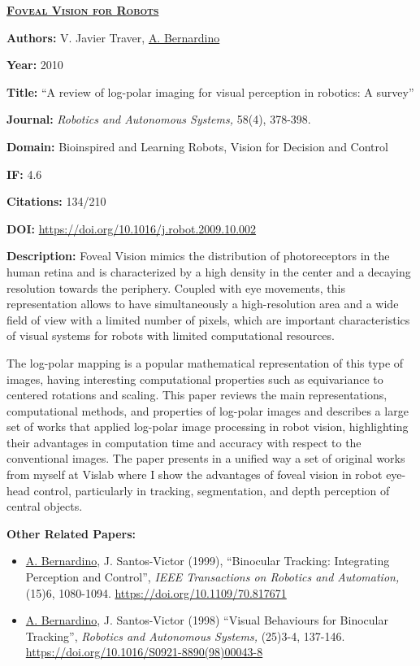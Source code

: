 \documentclass[
]{article}
\begin{document}
\textbf{\textsc{\ul{Foveal Vision for Robots}}}

\textbf{Authors:} V. Javier Traver, \ul{A. Bernardino}

\textbf{Year:} 2010

\textbf{Title:} ``A review of log-polar imaging for visual perception in
robotics: A survey''

\textbf{Journal:} \emph{Robotics and Autonomous Systems,} 58(4),
378-398.

\textbf{Domain:} Bioinspired and Learning Robots, Vision for Decision
and Control

\textbf{IF:} 4.6

\textbf{Citations:} 134/210

\textbf{DOI:} \url{https://doi.org/10.1016/j.robot.2009.10.002}

\textbf{Description:} Foveal Vision mimics the distribution of
photoreceptors in the human retina and is characterized by a high
density in the center and a decaying resolution towards the periphery.
Coupled with eye movements, this representation allows to have
simultaneously a high-resolution area and a wide field of view with a
limited number of pixels, which are important characteristics of visual
systems for robots with limited computational resources.

The log-polar mapping is a popular mathematical representation of this
type of images, having interesting computational properties such as
equivariance to centered rotations and scaling. This paper reviews the
main representations, computational methods, and properties of log-polar
images and describes a large set of works that applied log-polar image
processing in robot vision, highlighting their advantages in computation
time and accuracy with respect to the conventional images. The paper
presents in a unified way a set of original works from myself at Vislab
where I show the advantages of foveal vision in robot eye-head control,
particularly in tracking, segmentation, and depth perception of central
objects.

\textbf{Other Related Papers:}

\begin{itemize}
\item
  \ul{A. Bernardino}, J. Santos-Victor (1999), ``Binocular Tracking:
  Integrating Perception and Control'', \emph{IEEE Transactions on
  Robotics and Automation,} (15)6, 1080-1094.
  \url{https://doi.org/10.1109/70.817671}
\item
  \ul{A. Bernardino}, J. Santos-Victor (1998) ``Visual Behaviours for
  Binocular Tracking'', \emph{Robotics and Autonomous Systems,} (25)3-4,
  137-146. \url{https://doi.org/10.1016/S0921-8890(98)00043-8}
\end{itemize}
\end{document}
